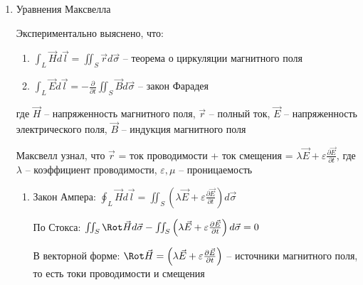 \documentclass[12pt]{article}
\begin{document}
\begin{enumerate}[label*=\arabic** ]
        Учтем: $\frac{d \rho}{dt} = \frac{\partial \rho}{\partial t} +  \frac{\partial \rho}{\partial x} \frac{dx}{dt} +  \frac{\partial \rho}{\partial y} \frac{dy}{dt} + \frac{\partial \rho}{\partial z} \frac{dz}{dt} = \frac{\partial \rho}{\partial t} + \vec\nabla \rho \vec{v}$

        $\vec\nabla (\rho \vec{v}) = \vec\nabla \rho \cdot \vec{v} + \rho \vec\nabla \vec{v} \Longleftrightarrow \vec\nabla \rho \vec{v} = \vec\nabla (\rho \vec{v}) - \rho \vec\nabla \vec{v}$

        $\frac{d\rho}{dt} + \rho \Div \vec{v} = 0$ -- уравнение неразрывности (при несжимаемой жидкости $\Div \vec{v} = 0$)

        \item Уравнения Максвелла

        Экспериментально выяснено, что: 
        
        \begin{enumerate}
            \item $\int_L \vec{H} d\vec{l} = \iint_S \vec{r}d\vec{\sigma}$ -- теорема о циркуляции магнитного поля

            \item $\int_L \vec{E} d\vec{l} = -\frac{\partial}{\partial t} \iint_S \vec{B}d\vec{\sigma}$ -- закон Фарадея
        \end{enumerate}

        где $\vec{H}$ -- напряженность магнитного поля, $\vec{r}$ -- полный ток, $\vec{E}$ -- напряженность электрического поля, $\vec{B}$ -- индукция магнитного поля

        Максвелл узнал, что $\vec{r}$ = ток проводимости + ток смещения = $\lambda \vec{E} + \varepsilon \frac{\partial \vec{E}}{\partial t}$, где $\lambda$ -- коэффициент проводимости, $\varepsilon, \mu$ -- проницаемость

        \begin{enumerate}
            \item Закон Ампера: $\oint_L \vec{H} d\vec{l} = \iint_S \left(\lambda \vec{E} + \varepsilon \frac{\partial \vec{E}}{\partial t}\right) d\vec{\sigma}$

            По \Ths Стокса: $\iint_S \Rot \vec{H} d\vec{\sigma} - \iint_S \left(\lambda \vec{E} + \varepsilon \frac{\partial \vec{E}}{\partial t}\right) d\vec{\sigma} = 0$

            В векторной форме: $\Rot \vec{H} = \left(\lambda \vec{E} + \varepsilon \frac{\partial \vec{E}}{\partial t}\right)$ -- источники магнитного поля, то есть токи проводимости и смещения


\end{enumerate}
\end{enumerate}
\end{document}
